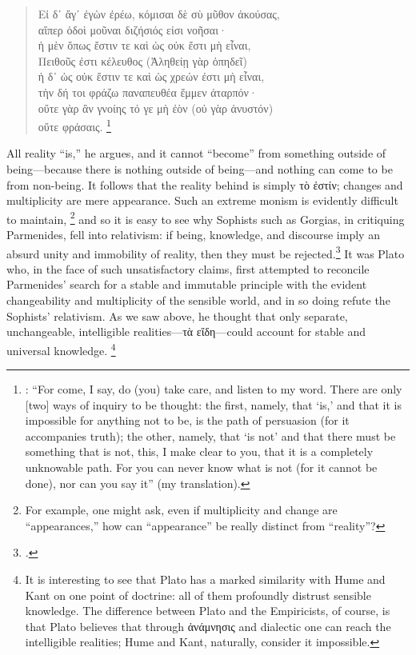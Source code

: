 \begin{quotation}\noindent
Εἰ δ᾽ ἄγ᾽ ἐγὼν ἐρέω, κόμισαι δὲ σὺ μῦθον ἀκούσας,\\ 
αἵπερ ὁδοὶ μοῦναι διζήσιός εἰσι νοῆσαι·\\
ἡ μὲν ὅπως ἔστιν τε καὶ ὡς οὐκ ἔστι μὴ εἶναι,\\
Πειθοῦς ἐστι κέλευθος (Ἀληθείῃ γὰρ ὀπηδεῖ)\\
ἡ δ᾽ ὡς οὐκ ἔστιν τε καὶ ὡς χρεών ἐστι μὴ εἶναι, \\
τὴν δή τοι φράζω παναπευθέα ἔμμεν ἀταρπόν· \\
οὔτε γὰρ ἂν γνοίης τό γε μὴ ἐὸν (οὐ γὰρ ἀνυστόν) \\
οὔτε φράσαις.%
%
\footnote{\Cite[DK28b2]{dk}: “For come, I say, do (you) take care, and listen to my word. There are only [two] ways of inquiry to be thought: the first, namely, that ‘is,’ and that it is impossible for anything not to be, is the path of persuasion (for it accompanies truth); the other, namely, that ‘is not’ and that there must be something that is not, this, I make clear to you, that it is a completely unknowable path. For you can never know what is not (for it cannot be done), nor can you say it” (my translation).}
%
\end{quotation}
%
All reality “is,” he argues, and it cannot “become” from something outside of being—because there is nothing outside of being—and nothing can come to be from non-being. It follows that the reality behind is simply τὸ ἐστίν; changes and multiplicity are mere appearance. Such an extreme monism is evidently difficult to maintain,%
%
\footnote{For example, one might ask, even if multiplicity and change are “appearances,” how can “appearance” be really distinct from “reality”?} and so it is easy to see why Sophists such as Gorgias, in critiquing Parmenides, fell into relativism: if being, knowledge, and discourse imply an absurd unity and immobility of reality, then they must be rejected.\footcite[93–94]{copleston:history:01} It was Plato who, in the face of such unsatisfactory claims, first attempted to reconcile Parmenides’ search for a stable and immutable principle with the evident changeability and multiplicity of the sensible world, and in so doing refute the Sophists’ relativism. As we saw above, he thought that only separate, unchangeable, intelligible realities—τὰ εἴδη—could account for stable and universal knowledge.%
%
\footnote{It is interesting to see that Plato has a marked similarity with Hume and Kant on one point of doctrine: all of them profoundly distrust sensible knowledge. The difference between Plato and the Empiricists, of course, is that Plato believes that through ἀνάμνησις and dialectic one can reach the intelligible realities; Hume and Kant, naturally, consider it impossible.}
